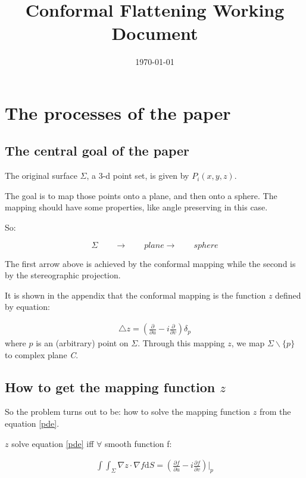 \documentclass[letterpaper]{article}
\begin{document}
  \title{Conformal Flattening Working Document}
  \date{\today}

  \maketitle

  \section{The processes of the paper}

  \subsection{The central goal of the paper}
  The original surface $\Sigma$, a 3-d point set, is given by $P_i(x,
  y, z)$.

  The goal is to map those points onto a plane, and then onto a
  sphere.  The mapping should have some properties, like angle
  preserving in this case.

  So:

  \begin{displaymath}
    \Sigma \qquad \rightarrow \qquad plane \rightarrow  \qquad sphere
  \end{displaymath}

  The first arrow above is achieved by the conformal mapping while the
  second is by the stereographic projection.

  It is shown in the appendix that the conformal mapping is the
  function $z$ defined by equation:

  \begin{eqnarray}
    \triangle z = (\frac{\partial}{\partial u} -
    i\frac{\partial}{\partial v})\delta_p \label{pde}
  \end{eqnarray}
  where $p$ is an (arbitrary) point on $\Sigma$. Through this mapping
  $z$, we map $\Sigma \backslash \{ p \}$ to complex plane \emph{C}.


  \subsection{How to get the mapping function $z$}
  So the problem turns out to be: how to solve the mapping function
  $z$ from the equation \ref{pde}.

  $z$ solve equation \ref{pde} iff $\forall$ smooth function f:

  \begin{eqnarray}
    \int\int_{\Sigma}\nabla z \cdot \nabla f \textrm{d}S =
    (\frac{\partial f}{\partial u} - i\frac{\partial f}{\partial
      v})|_p \label{inteqn}
  \end{eqnarray}  
\end{document}

